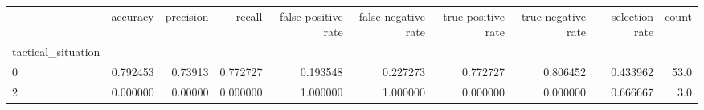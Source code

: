 \begin{tabular}{lrrrrrrrrr}
\toprule
{} &  accuracy &  precision &    recall &  false positive rate &  false negative rate &  true positive rate &  true negative rate &  selection rate &  count \\
tactical\_situation &           &            &           &                      &                      &                     &                     &                 &        \\
\midrule
0                  &  0.792453 &    0.73913 &  0.772727 &             0.193548 &             0.227273 &            0.772727 &            0.806452 &        0.433962 &   53.0 \\
2                  &  0.000000 &    0.00000 &  0.000000 &             1.000000 &             1.000000 &            0.000000 &            0.000000 &        0.666667 &    3.0 \\
\bottomrule
\end{tabular}
